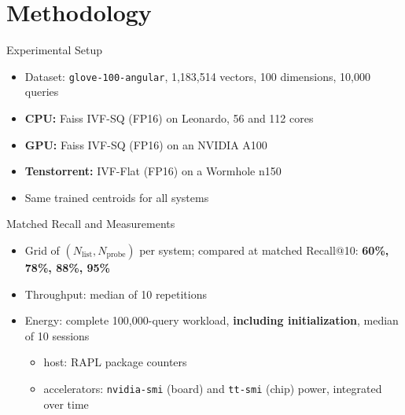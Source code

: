 \section{Methodology}

\begin{frame}{Experimental Setup}
  \begin{itemize}
    \item Dataset: \texttt{glove-100-angular}, 1,183,514 vectors, 100 dimensions, 10,000 queries
    \item \textbf{CPU:} Faiss IVF-SQ (FP16) on Leonardo, 56 and 112 cores
    \item \textbf{GPU:} Faiss IVF-SQ (FP16) on an NVIDIA A100
    \item \textbf{Tenstorrent:} IVF-Flat (FP16) on a Wormhole n150
    \item Same trained centroids for all systems
  \end{itemize}
\end{frame}

\begin{frame}{Matched Recall and Measurements}
  \begin{itemize}
    \item Grid of $(N_{\mathrm{list}},N_{\mathrm{probe}})$ per system; compared at matched Recall@10: \textbf{60\%, 78\%, 88\%, 95\%}
    \item Throughput: median of 10 repetitions
    \item Energy: complete 100,000-query workload, \textbf{including initialization}, median of 10 sessions
    \begin{itemize}
      \item host: RAPL package counters
      \item accelerators: \texttt{nvidia-smi} (board) and \texttt{tt-smi} (chip) power, integrated over time
    \end{itemize}
  \end{itemize}
\end{frame}
